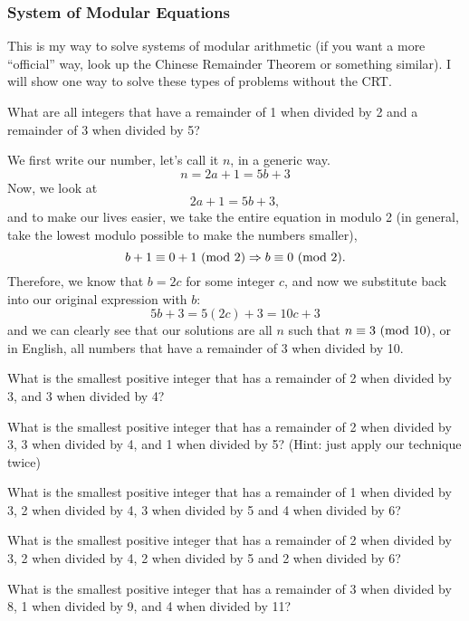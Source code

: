 			\subsubsection{System of Modular Equations}
				This is my way to solve systems of modular arithmetic (if you want a more ``official'' way, look up the Chinese Remainder Theorem or something similar). I will show one way to solve these types of problems without the CRT.\par
				\begin{problem} What are all integers that have a remainder of 1 when divided by 2 and a remainder of 3 when divided by 5?\end{problem}
				\begin{solution}
				We first write our number, let's call it $n$, in a generic way.
				$$n = 2a+1=5b+3$$
				Now, we look at 
				$$2a+1=5b+3,$$
				and to make our lives easier, we take the entire equation in modulo 2 (in general, take the lowest modulo possible to make the numbers smaller),
				$$b+1 \equiv 0+1 \ (\text{mod}\ 2) \Rightarrow b\equiv0 \ (\text{mod}\ 2).$$
				Therefore, we know that $b=2c$ for some integer $c$, and now we substitute back into our original expression with $b$:
				$$5b+3 = 5(2c)+3 = 10c+3$$
				and we can clearly see that our solutions are all $n$ such that $n\equiv3\ (\text{mod}\ 10)$, or in English, all numbers that have a remainder of 3 when divided by 10.
				\end{solution}
				\begin{problem} What is the smallest positive integer that has a remainder of 2 when divided by 3, and 3 when divided by 4?\end{problem} \vspace{1in}
				\begin{problem} What is the smallest positive integer that has a remainder of 2 when divided by 3, 3 when divided by 4, and 1 when divided by 5? (Hint: just apply our technique twice)\end{problem} \vspace{1in}
				\begin{problem} What is the smallest positive integer that has a remainder of 1 when divided by 3, 2 when divided by 4, 3 when divided by 5 and 4 when divided by 6? \end{problem}\vspace{1in}
				\begin{problem} What is the smallest positive integer that has a remainder of 2 when divided by 3, 2 when divided by 4, 2 when divided by 5 and 2 when divided by 6?\end{problem}\vspace{1in}
				\begin{problem} What is the smallest positive integer that has a remainder of 3 when divided by 8, 1 when divided by 9, and 4 when divided by 11?\end{problem}